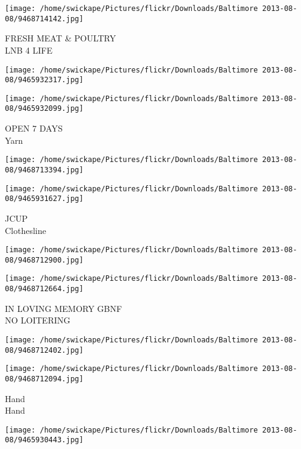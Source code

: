 \documentclass[10pt,letterpaper]{article}
\begin{document}
\vspace{0.25in}
\texttt{[image: /home/swickape/Pictures/flickr/Downloads/Baltimore 2013-08-08/9468714142.jpg]}

FRESH MEAT \& POULTRY\\
LNB 4 LIFE\\
\pagebreak

\texttt{[image: /home/swickape/Pictures/flickr/Downloads/Baltimore 2013-08-08/9465932317.jpg]}

\vspace{0.25in}
\texttt{[image: /home/swickape/Pictures/flickr/Downloads/Baltimore 2013-08-08/9465932099.jpg]}

OPEN 7 DAYS\\
Yarn\\
\pagebreak

\texttt{[image: /home/swickape/Pictures/flickr/Downloads/Baltimore 2013-08-08/9468713394.jpg]}

\vspace{0.25in}
\texttt{[image: /home/swickape/Pictures/flickr/Downloads/Baltimore 2013-08-08/9465931627.jpg]}

JCUP\\
Clothesline\\
\pagebreak

\texttt{[image: /home/swickape/Pictures/flickr/Downloads/Baltimore 2013-08-08/9468712900.jpg]}

\vspace{0.25in}
\texttt{[image: /home/swickape/Pictures/flickr/Downloads/Baltimore 2013-08-08/9468712664.jpg]}

IN LOVING MEMORY GBNF\\
NO LOITERING\\
\pagebreak

\texttt{[image: /home/swickape/Pictures/flickr/Downloads/Baltimore 2013-08-08/9468712402.jpg]}

\vspace{0.25in}
\texttt{[image: /home/swickape/Pictures/flickr/Downloads/Baltimore 2013-08-08/9468712094.jpg]}

Hand\\
Hand\\
\pagebreak

\texttt{[image: /home/swickape/Pictures/flickr/Downloads/Baltimore 2013-08-08/9465930443.jpg]}
\end{document}
